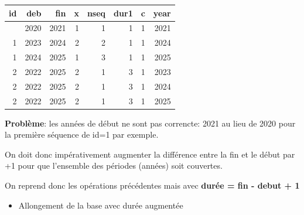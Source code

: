 \documentclass[
  12pt,
  letterpaper,
  DIV=11,
  numbers=noendperiod,
  onepage,
  openany]{scrreprt}
\newenvironment{Shaded}{\begin{snugshade}}{\end{snugshade}}
\newcommand{\CommentTok}[1]{\textcolor[rgb]{0.50,0.62,0.50}{#1}}
\newcommand{\DecValTok}[1]{\textcolor[rgb]{0.86,0.86,0.80}{#1}}
\newcommand{\FunctionTok}[1]{\textcolor[rgb]{0.94,0.94,0.56}{#1}}
\newcommand{\NormalTok}[1]{\textcolor[rgb]{0.80,0.80,0.80}{#1}}
\newcommand{\OtherTok}[1]{\textcolor[rgb]{0.94,0.94,0.56}{#1}}
\newcommand{\SpecialCharTok}[1]{\textcolor[rgb]{0.86,0.64,0.64}{#1}}
\providecommand{\tightlist}{%
  \setlength{\itemsep}{0pt}\setlength{\parskip}{0pt}}\usepackage{longtable,booktabs,array}
\begin{document}
\begin{longtable}[]{@{}rrrrrrrr@{}}
\toprule\noalign{}
id & deb & fin & x & nseq & dur1 & c & year \\
\midrule\noalign{}
\endhead
\bottomrule\noalign{}
\endlastfoot
1 & 2020 & 2021 & 1 & 1 & 1 & 1 & 2021 \\
1 & 2023 & 2024 & 2 & 2 & 1 & 1 & 2024 \\
1 & 2024 & 2025 & 1 & 3 & 1 & 1 & 2025 \\
2 & 2022 & 2025 & 2 & 1 & 3 & 1 & 2023 \\
2 & 2022 & 2025 & 2 & 1 & 3 & 1 & 2024 \\
2 & 2022 & 2025 & 2 & 1 & 3 & 1 & 2025 \\
\end{longtable}

\textbf{Problème}: les années de début ne sont pas correncte: 2021 au
lieu de 2020 pour la première séquence de id=1 par exemple.

\begin{tcolorbox}[enhanced jigsaw, arc=.35mm, bottomrule=.15mm, titlerule=0mm, colbacktitle=quarto-callout-important-color!10!white, left=2mm, opacitybacktitle=0.6, toprule=.15mm, title=\textcolor{quarto-callout-important-color}{\faExclamation}\hspace{0.5em}{Important}, colframe=quarto-callout-important-color-frame, breakable, coltitle=black, opacityback=0, toptitle=1mm, bottomtitle=1mm, rightrule=.15mm, leftrule=.75mm, colback=white]

On doit donc impérativement augmenter la différence entre la fin et le
début par +1 pour que l'ensemble des périodes (années) soit couvertes.

\end{tcolorbox}

On reprend donc les opérations précédentes mais avec \textbf{durée = fin
- debut + 1}

\begin{itemize}
\tightlist
\item
  Allongement de la base avec durée augmentée
\end{itemize}

\begin{Shaded}
\end{Shaded}
\end{document}
